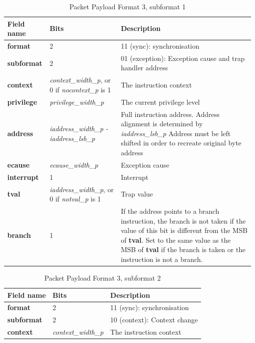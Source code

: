\begin{table}[htp]
  \centering
  \caption{Packet Payload Format 3, subformat 1}
  \label{tab:te_inst3}
  \begin{tabulary}{\textwidth}{|l|p{35mm}|p{80mm}|}
    \hline
    {\bf Field name} & {\bf Bits} & {\bf Description} \\
    \hline
    \textbf{format} & 2 & 11 (sync): synchronisation\\
    \hline
    \textbf{subformat} & 2 & 01 (exception): Exception cause and trap handler address\\
    \hline
    \textbf{context} &  \textit {context\_width\_p}, 
               or 0 if \textit {nocontext\_p} is 1 & 
               The instruction context \\
    \hline
    \textbf{privilege} & \textit {privilege\_width\_p} & 
                The current privilege level \\
    \hline
    \textbf{address} & \textit {iaddress\_width\_p - iaddress\_lsb\_p} & 
              Full instruction address.  Address alignment is determined by \textit {iaddress\_lsb\_p} Address must be left shifted in order to recreate original byte address \\
    \hline
    \textbf{ecause} & \textit {ecause\_width\_p} & 
             Exception cause \\
    \hline
    \textbf{interrupt} & 1 & 
                Interrupt \\
    \hline
    \textbf{tval} & \textit {iaddress\_width\_p}, 
           or 0 if \textit {notval\_p} is 1 & 
           Trap value \\
    \hline
    \textbf{branch} & 1 & If the address points to a branch instruction, the branch is not taken if the value of this bit is different from the MSB of \textbf{tval}. 
    Set to the same value as the MSB of \textbf{tval} if the branch is taken or the instruction is not a branch. \\
    \hline
  \end{tabulary}
\end{table}

\begin{table}[htp]
  \centering
  \caption{Packet Payload Format 3, subformat 2}
  \label{tab:te_inst3}
  \begin{tabulary}{\textwidth}{|l|p{35mm}|p{80mm}|}
    \hline
    {\bf Field name} & {\bf Bits} & {\bf Description} \\
    \hline
    \textbf{format} & 2 & 11 (sync): synchronisation\\
    \hline
    \textbf{subformat}  & 2 & 10 (context): Context change \\
    \hline
    \textbf{context} &  \textit {context\_width\_p} & The instruction context \\
      \hline
  \end{tabulary}
\end{table}

